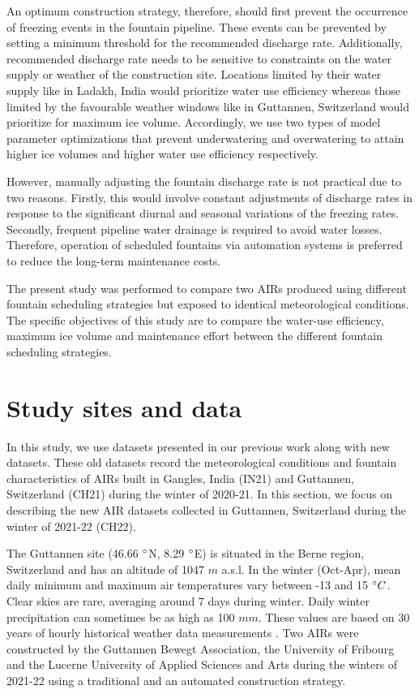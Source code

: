 \documentclass[tc, manuscript]{copernicus}
\begin{document}
An optimum construction strategy, therefore, should first prevent the occurrence of freezing events in the
fountain pipeline. These events can be prevented by setting a minimum threshold for the recommended discharge
rate. Additionally, recommended discharge rate needs to be sensitive to constraints on the water supply or
weather of the construction site. Locations limited by their water supply like in Ladakh, India would prioritize
water use efficiency whereas those limited by the favourable weather windows like in Guttannen, Switzerland
would prioritize for maximum ice volume. Accordingly, we use two types of model parameter optimizations that
prevent underwatering and overwatering to attain higher ice volumes and higher water use efficiency
respectively.


However, manually adjusting the fountain discharge rate is not practical due to two reasons. Firstly, this would
involve constant adjustments of discharge rates in response to the significant diurnal and seasonal variations
of the freezing rates. Secondly, frequent pipeline water drainage is required to avoid water losses. Therefore,
operation of scheduled fountains via automation systems is preferred to reduce the long-term maintenance costs.

The present study was performed to compare two AIRs produced using different fountain scheduling strategies but
exposed to identical meteorological conditions. The specific objectives of this study are to compare the
water-use efficiency, maximum ice volume and maintenance effort between the different fountain scheduling strategies.

\section{Study sites and data}

In this study, we use datasets presented in our previous work
\citep{balasubramanianInfluenceMeteorologicalConditions2022} along with new datasets. These old datasets record
the meteorological conditions and fountain characteristics of AIRs built in Gangles, India (IN21) and Guttannen,
Switzerland (CH21) during the winter of 2020-21. In this section, we focus on describing the new AIR datasets
collected in Guttannen, Switzerland during the winter of 2021-22 (CH22).

The Guttannen site (46.66 $^{\circ}$N, 8.29 $^{\circ}$E) is situated in the Berne region, Switzerland and has an
altitude of 1047 $m$ a.s.l. In the winter (Oct-Apr), mean daily minimum and maximum air temperatures vary
between -13 and 15 $^{\circ} C$. Clear skies are rare, averaging around 7 days during winter. Daily winter
precipitation can sometimes be as high as 100 $mm$. These values are based on 30 years of hourly historical
weather data measurements \citep{meteoblueClimateGuttannen2021}. Two AIRs were constructed by the Guttannen
Bewegt Association, the University of Fribourg and the Lucerne University of Applied Sciences and Arts during
the winters of 2021-22 using a traditional and an automated construction strategy.
\end{document}
